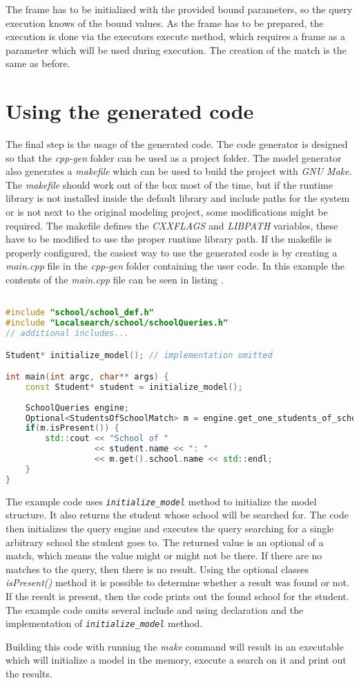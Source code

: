 The frame has to be initialized with
the provided bound parameters, so the query execution knows of the bound values.
As the frame has to be prepared, the execution is done via the executors execute
method, which requires a frame as a parameter which will be used during
execution. The creation of the match is the same as before.

\section{Using the generated code}

The final step is the usage of the generated code. The code generator is
designed so that the \emph{cpp-gen} folder can be used as a project folder. The
model generator also generates a \emph{makefile} which can be used to build the
project with \emph{GNU Make}. The \emph{makefile} should work out of the box
most of the time, but if the runtime library is not installed inside the default
library and include paths for the system or is not next to the original modeling
project, some modifications might be required. The makefile defines the
\emph{CXXFLAGS} and \emph{LIBPATH} variables, these have to be modified to use
the proper runtime library path. If the makefile is properly configured, the
easiest way to use the generated code is by creating a \emph{main.cpp} file in
the \emph{cpp-gen} folder containing the user code. In this example the contents
of the \emph{main.cpp} file can be seen in listing .

\begin{lstlisting}[frame=single,float=!ht,language=C++,
label=listing:example_school_cpp, caption=Fragment of the \emph{main.cpp}
file for the example project]

#include "school/school_def.h"
#include "Localsearch/school/schoolQueries.h"
// additional includes...

Student* initialize_model(); // implementation omitted

int main(int argc, char** args) {
	const Student* student = initialize_model();
	
	SchoolQueries engine;
	Optional<StudentsOfSchoolMatch> m = engine.get_one_students_of_school(student); 
	if(m.isPresent()) { 
		std::cout << "School of " 
				  << student.name << ": " 
				  << m.get().school.name <<	std::endl; 
	}
}
\end{lstlisting}

The example code uses \emph{\texttt{initialize\_model}} method to initialize the
model structure. It also returns the student whose school will be searched for.
The code then initializes the query engine and executes the query searching for
a single arbitrary school the student goes to. The returned value is an optional
of a match, which means the value might or might not be there. If there are no
matches to the query, then there is no result. Using the optional classes
\emph{isPresent()} method it is possible to determine whether a result was found or not.
If the result is present, then the code prints out the found school for the
student. The example code omits several include and using declaration and the
implementation of \emph{\texttt{initialize\_model}} method.

Building this code with running the \emph{make} command will result in an
executable which will initialize a model in the memory, execute a search on it
and print out the results.

